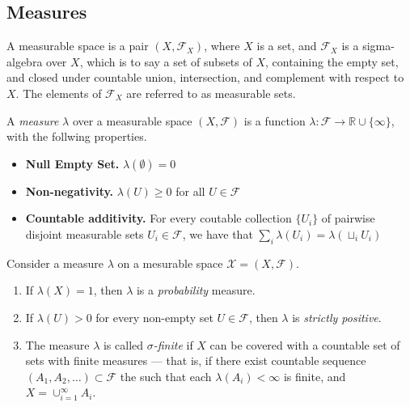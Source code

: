 \documentclass[twoside]{article} %
\theoremstyle{plain}
\theoremstyle{definition}
\begin{document}
    \subsection{Measures}
    
    \begin{defn}
        A measurable space is a pair $(X, \mathcal F_X)$, where $X$ is a set, and   $\mathcal F_X$ is a sigma-algebra over $X$, which is to say a set of subsets of $X$, containing the empty set, and closed under countable union, intersection, and complement with respect to $X$.
        The elements of $\mathcal F_X$ are referred to as measurable sets.
    \end{defn}
    
    \begin{defn}[Measure]
        A \emph{measure} $\lambda$ over a measurable space $(X, \mathcal F)$ is a function $\lambda : \mathcal F \to \mathbb R \cup \{\infty\}$, with the follwing properties.
        \begin{itemize}[itemsep=0pt]
            \item \textbf{Null Empty Set.} $\lambda(\emptyset) = 0$
            \item \textbf{Non-negativity.} $\lambda(U) \ge 0$ for all $U \in \mathcal F$
            \item \textbf{Countable additivity.} For every coutable collection $\{U_i\}$ of pairwise disjoint measurable sets $U_i \in \mathcal F$, we have that
             $\sum_{i} \lambda(U_i) = \lambda(\sqcup_i U_i)$
        \end{itemize}
    \end{defn}
    
    \begin{defn}
        Consider a measure $\lambda$ on a mesurable space $\mathcal X = (X, \mathcal F)$.
        \begin{enumerate}
            \item If $\lambda(X) = 1$, then $\lambda$ is a \emph{probability} measure. \\
            \item If $\lambda(U) > 0$ for every non-empty set $U \in \mathcal F$, then $\lambda$ is \emph{strictly positive}.
            \item The measure $\lambda$ is called \emph{$\sigma$-finite} if $X$ can be
            covered with a countable set of sets with finite measures --- that is, if
            there exist countable sequence $(A_1, A_2, \ldots ) \subset \mathcal F$ the
            such that each $\lambda(A_i) < \infty$ is finite, and $X = \cup_{i=1}^{\infty}
            A_i$.
        \end{enumerate}
    \end{defn}
    
\end{document}
